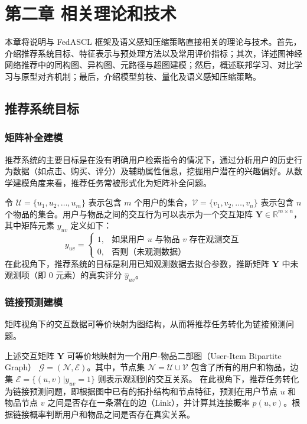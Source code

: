 \newpage
\section{第二章\texorpdfstring{\quad}{} 相关理论和技术}
\label{chap:related}
\setcounter{section}{2} \setcounter{subsection}{0}


本章将说明与 FedASCL 框架及语义感知压缩策略直接相关的理论与技术。首先，介绍推荐系统目标、特征表示与预处理方法以及常用评价指标；其次，详述图神经网络推荐中的同构图、异构图、元路径与超图建模；然后，概述联邦学习、对比学习与原型对齐机制；最后，介绍模型剪枝、量化及语义感知压缩策略。

\subsection{推荐系统目标}

\subsubsection{矩阵补全建模}
推荐系统的主要目标是在没有明确用户检索指令的情况下，通过分析用户的历史行为数据（如点击、购买、评分）及辅助属性信息，挖掘用户潜在的兴趣偏好。从数学建模角度来看，推荐任务常被形式化为矩阵补全问题。

令 $\mathcal{U} = \{u_1, u_2, \dots, u_m\}$ 表示包含 $m$ 个用户的集合，$\mathcal{V} = \{v_1, v_2, \dots, v_n\}$ 表示包含 $n$ 个物品的集合。用户与物品之间的交互行为可以表示为一个交互矩阵 $\mathbf{Y} \in \mathbb{R}^{m \times n}$，其中矩阵元素 $y_{uv}$ 定义如下：
\begin{equation}
y_{uv} = \begin{cases} 
1, & \text{如果用户 } u \text{ 与物品 } v \text{ 存在观测交互} \\
0, & \text{否则（未观测数据）}
\end{cases}
\end{equation}
在此视角下，推荐系统的目标是利用已知观测数据去拟合参数，推断矩阵 $\mathbf{Y}$ 中未观测项（即 $0$ 元素）的真实评分 $\hat{y}_{uv}$。

\subsubsection{链接预测建模}
矩阵视角下的交互数据可等价映射为图结构，从而将推荐任务转化为链接预测问题。

上述交互矩阵 $\mathbf{Y}$ 可等价地映射为一个用户-物品二部图（User-Item Bipartite Graph） $\mathcal{G} = (\mathcal{N}, \mathcal{E})$。其中，节点集 $\mathcal{N} = \mathcal{U} \cup \mathcal{V}$ 包含了所有的用户和物品，边集 $\mathcal{E} = \{(u, v) | y_{uv} = 1\}$ 则表示观测到的交互关系。
在此视角下，推荐任务转化为链接预测问题，即根据图中已有的拓扑结构和节点特征，预测在用户节点 $u$ 和物品节点 $v$ 之间是否存在一条潜在的边（Link），并计算其连接概率 $p(u, v)$。根据链接概率判断用户和物品之间是否存在真实关系\cite{he2020lightgcn}。

